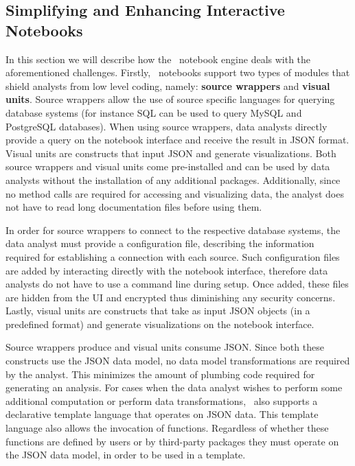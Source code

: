  

\subsection{Simplifying and Enhancing Interactive Notebooks}

In this section we will describe how the \projname\ notebook engine deals with the aforementioned challenges. Firstly, \projname\ notebooks support two types of modules that shield analysts from low level coding, namely: \textbf{source wrappers} and \textbf{visual units}. Source wrappers allow the use of source specific languages for querying database systems (for instance SQL can be used to query MySQL and PostgreSQL databases). When using source wrappers, data analysts directly provide a query on the notebook interface and receive the result in JSON format. Visual units are constructs that input JSON and generate visualizations. Both source wrappers and visual units come pre-installed and can be used by data analysts without the installation of any additional packages. Additionally, since no method calls are required for accessing and visualizing data, the analyst does not have to read long documentation files before using them. 

In order for source wrappers to connect to the respective database systems, the data analyst must provide a configuration file, describing the information required for establishing a connection with each source. Such configuration files are added by interacting directly with the notebook interface, therefore data analysts do not have to use a command line during setup. Once added, these files are hidden from the UI and encrypted thus diminishing any security concerns. Lastly, visual units are constructs that take as input JSON objects (in a predefined format) and generate visualizations on the notebook interface. 


Source wrappers produce and visual units consume JSON. Since both these constructs use the JSON data model, no data model transformations are required by the analyst. This minimizes the amount of plumbing code required for generating an analysis. For cases when the data analyst wishes to perform some additional computation or perform data transformations, \projname\ also supports a declarative template language that operates on JSON data. This template language also allows the invocation of functions. Regardless of whether these functions are defined by users or by third-party packages they must operate on the JSON data model, in order to be used in a template.

